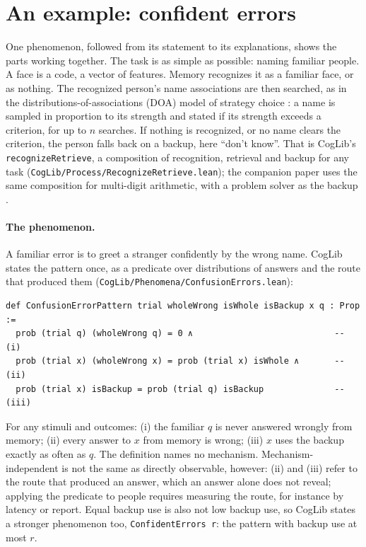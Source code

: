 \documentclass[11pt]{article}
\newcommand{\code}[1]{\texttt{#1}}
\newcommand{\lean}[1]{\texttt{#1}}
\begin{document}
\section{An example: confident errors}
\label{sec:example}

One phenomenon, followed from its statement to its explanations, shows the parts working together. The task is as simple as possible: naming familiar people. A face is a code, a vector of features. Memory recognizes it as a familiar face, or as nothing. The recognized person's name associations are then searched, as in the distributions-of-associations (DOA) model of strategy choice \citep{siegler1984}: a name is sampled in proportion to its strength and stated if its strength exceeds a criterion, for up to $n$ searches. If nothing is recognized, or no name clears the criterion, the person falls back on a backup, here ``don't know''. That is CogLib's \code{recognizeRetrieve}, a composition of recognition, retrieval and backup for any task (\code{CogLib/Process/RecognizeRetrieve.lean}); the companion paper uses the same composition for multi-digit arithmetic, with a problem solver as the backup \citep{shrager2026multidigit}.

\paragraph{The phenomenon.} A familiar error is to greet a stranger confidently by the wrong name. CogLib states the pattern once, as a predicate over distributions of answers and the route that produced them (\code{CogLib/Phenomena/ConfusionErrors.lean}):
\begin{Verbatim}[fontsize=\small]
def ConfusionErrorPattern trial wholeWrong isWhole isBackup x q : Prop :=
  prob (trial q) (wholeWrong q) = 0 ∧                            -- (i)
  prob (trial x) (wholeWrong x) = prob (trial x) isWhole ∧       -- (ii)
  prob (trial x) isBackup = prob (trial q) isBackup              -- (iii)
\end{Verbatim}
For any stimuli and outcomes: (i) the familiar $q$ is never answered wrongly from memory; (ii) every answer to $x$ from memory is wrong; (iii) $x$ uses the backup exactly as often as $q$. The definition names no mechanism. Mechanism-independent is not the same as directly observable, however: (ii) and (iii) refer to the route that produced an answer, which an answer alone does not reveal; applying the predicate to people requires measuring the route, for instance by latency or report. Equal backup use is also not low backup use, so CogLib states a stronger phenomenon too, \lean{ConfidentErrors r}: the pattern with backup use at most $r$.
\end{document}
